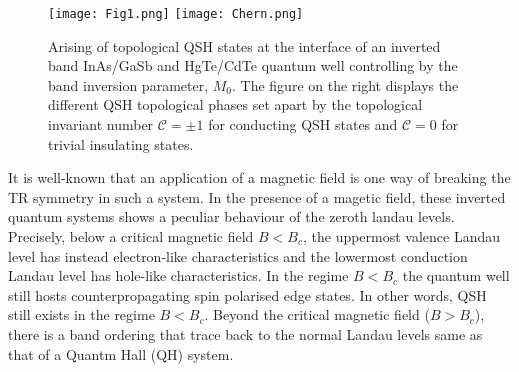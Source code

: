 \documentclass[prb,twocolumn]{revtex4-1}
\begin{document}
\begin{figure}[t]
	\texttt{[image: Fig1.png]}
	\texttt{[image: Chern.png]}
	\caption{Arising of topological QSH states at the interface of an inverted band InAs/GaSb and HgTe/CdTe quantum well controlling by the band inversion parameter, $M_0$. The figure on the right displays the different QSH topological phases set apart by the topological invariant number $\mathcal{C}=\pm 1$ for conducting QSH states and $\mathcal{C}=0$ for trivial insulating states.}
	\label{Fig1}
\end{figure}

It is well-known that an application of a magnetic field is one way of breaking the TR symmetry in such a system\cite{TRB}. In the presence of a magetic field, these inverted quantum systems shows a peculiar behaviour of the zeroth landau levels. %
Precisely, below a critical magnetic field $B<B_c$, the uppermost valence Landau level has instead electron-like characteristics and the lowermost conduction Landau level has hole-like characteristics\cite{ll1,ll2,ll3}. In the regime $B<B_c$ the quantum well still hosts counterpropagating spin polarised edge states. In other words, QSH still exists in the regime $B<B_c$.
Beyond the critical magnetic field ($B>B_c$), there is a band ordering that trace back to the normal Landau levels same as that of a Quantm Hall (QH) system.
\end{document}
